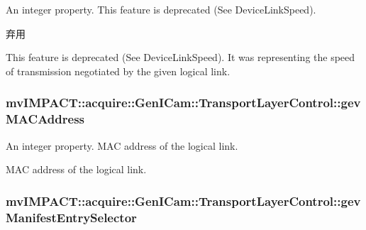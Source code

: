 An integer property. This feature is deprecated (See Device\+Link\+Speed). 

\begin{DoxyRefDesc}{弃用}
\item[\hyperlink{deprecated__deprecated000062}{弃用}]This feature is deprecated (See Device\+Link\+Speed). It was representing the speed of transmission negotiated by the given logical link. \end{DoxyRefDesc}
\hypertarget{classmv_i_m_p_a_c_t_1_1acquire_1_1_gen_i_cam_1_1_transport_layer_control_adcab47e95dd9a7372819c1485faaf62a}{
\subsubsection[{gev\+M\+A\+C\+Address}]{ mv\+I\+M\+P\+A\+C\+T\+::acquire\+::\+Gen\+I\+Cam\+::\+Transport\+Layer\+Control\+::gev\+M\+A\+C\+Address}}\label{classmv_i_m_p_a_c_t_1_1acquire_1_1_gen_i_cam_1_1_transport_layer_control_adcab47e95dd9a7372819c1485faaf62a}


An integer property. M\+A\+C address of the logical link. 

M\+A\+C address of the logical link. \hypertarget{classmv_i_m_p_a_c_t_1_1acquire_1_1_gen_i_cam_1_1_transport_layer_control_af40efcdfbee79275cce94c1c4d8afae7}{
\subsubsection[{gev\+Manifest\+Entry\+Selector}]{ mv\+I\+M\+P\+A\+C\+T\+::acquire\+::\+Gen\+I\+Cam\+::\+Transport\+Layer\+Control\+::gev\+Manifest\+Entry\+Selector}}\label{classmv_i_m_p_a_c_t_1_1acquire_1_1_gen_i_cam_1_1_transport_layer_control_af40efcdfbee79275cce94c1c4d8afae7}


